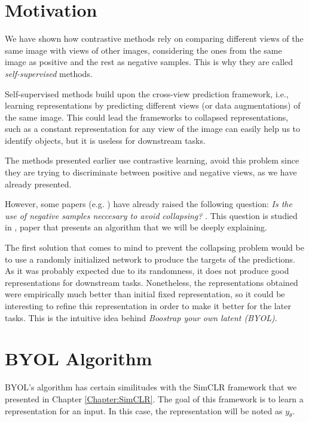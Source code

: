 \label{Chapter:BYOL}

\section{Motivation}

We have shown how contrastive methods rely on comparing different views of the same image with views of other images, considering the ones from the same image as positive and the rest as negative samples. This is why they are called \emph{self-supervised} methods.

Self-supervised methods build upon the cross-view prediction framework, i.e., learning representations by predicting different views (or data augmentations) of the same image. This could lead the frameworks to collapsed representations, such as a constant representation for any view of the image can easily help us to identify objects, but it is useless for downstream tasks.

The methods presented earlier  use contrastive learning, avoid this problem since they are trying to discriminate between positive and negative views, as we have already presented.

However, some papers (e.g. \cite{caron2019deep}) have already raised the following question: \emph{ Is the use of negative samples neccesary to avoid collapsing? }. This question is studied in \cite{grill2020bootstrap}, paper that presents an algorithm that we will be deeply explaining.

The first solution that comes to mind to prevent the collapsing problem would be to use a randomly initialized network to produce the targets of the predictions. As it was probably expected due to its randomness, it does not produce good representations for downstream tasks. Nonetheless, the representations obtained were empirically much better than initial fixed representation, so it could be interesting to refine this representation in order to make it better for the later tasks. This is the intuitive idea behind \emph{Boostrap your own latent (BYOL)}.

\section{BYOL Algorithm}

BYOL's algorithm has certain similitudes with the SimCLR framework that we presented in Chapter \ref{Chapter:SimCLR}. The goal of this framework is to learn a representation for an input. In this case, the representation will be noted as $y_\theta$. 

